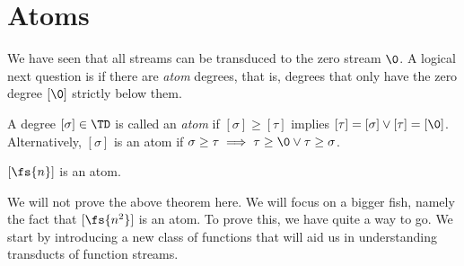 \section{Atoms}
We have seen that all streams can be transduced to the zero stream $\0$. A logical next question is if there are \textit{atom} degrees, that is, degrees that only have the zero degree $[\0]$ strictly below them. 

\begin{definition}
	A degree $[\sigma]\in\TD$ is called an \textit{atom} if $[\sigma]\geq[\tau]$ implies $[\tau] = [\sigma] \lor [\tau] = [\0]$.
	Alternatively, $[\sigma]$ is an atom if $\sigma \geq \tau \implies \tau \geq \0 \lor \tau \geq \sigma$.
\end{definition}

\begin{theorem}\label{n_atom}
	$[\fs{n}]$ is an atom.
\end{theorem}

We will not prove the above theorem here. We will focus on a bigger fish, namely the fact that $[\fs{n^2}]$ is an atom. To prove this, we have quite a way to go. We start by introducing a new class of functions that will aid us in understanding transducts of function streams.